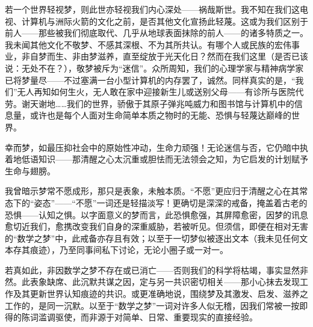 若一个世界轻视梦，则此世亦轻视我们内心深处——祸哉斯世。我不知在我们这电视、计算机与洲际火箭的文化之前，是否其他文化宣扬此轻蔑。这或为我们区别于前人——那些被我们彻底取代、几乎从地球表面抹除的前人——的诸多特质之一。我未闻其他文化不敬梦、不感其深根、不为其所共认。有哪个人或民族的宏伟事业，非自梦而生、非由梦滋养，直至绽放于光天化日？然而在我们这里（是否已该说：无处不在？），敬梦被斥为“迷信”。众所周知，我们的心理学家与精神病学家已将梦量尽——不过塞满一台小型计算机的内存罢了，诚然。同样真实的是，“我们”无人再知如何生火，无人敢在家中迎接新生儿或送别父母——有诊所与医院代劳。谢天谢地……我们的世界，骄傲于其原子弹兆吨威力和图书馆与计算机中的信息量，或许也是每个人面对生命简单本质之物时的无能、恐惧与轻蔑达巅峰的世界。

幸而梦，如最压抑社会中的原始性冲动，生命力顽强！无论迷信与否，它仍暗中执着地低语知识——那清醒之心太沉重或胆怯而无法领会之知，为它启发的计划赋予生命与翅膀。

我曾暗示梦常不愿成形，那只是表象，未触本质。“不愿”更应归于清醒之心在其常态下的“姿态”——“不愿”一词还是轻描淡写！更确切是深深的戒备，掩盖着古老的恐惧——认知之惧。以字面意义的梦而言，此恐惧愈强，其屏障愈密，因梦的讯息愈切近我们，愈携改变我们自身的深重威胁，若被听见。但须信，即便在相对无害的“数学之梦”中，此戒备亦存且有效；以至于一切梦似被逐出文本（我未见任何文本存其痕迹），乃至同事间私下讨论，无论小圈子或一对一。

若真如此，非因数学之梦不存在或已消亡——否则我们的科学将枯竭，事实显然非然。此表象缺席、此沉默共谋之因，定与另一共识密切相关——那小心抹去发现工作及其更新世界认知痕迹的共识。或更准确地说，围绕梦及其激发、启发、滋养之工作的，是同一沉默。以至于“数学之梦”一词对许多人似无稽，因我们常被一按即得的陈词滥调驱使，而非源于对简单、日常、重要现实的直接经验。